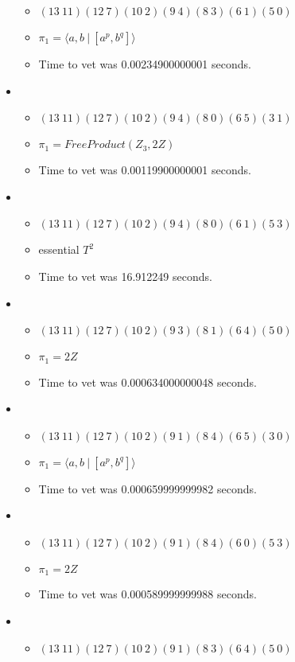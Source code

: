 \documentclass{article}
\begin{document}
\begin{itemize}
\begin{itemize}
      \item $(13\ 11)(12\ 7)(10\ 2)(9\ 4)(8\ 3)(6\ 1)(5\ 0)$
      \item $\pi_1 = \langle a,b\ |\ [a^p,b^q]\rangle$
      \item Time to vet was 0.00234900000001 seconds.
\end{itemize}
\item \begin{itemize}
      \item $(13\ 11)(12\ 7)(10\ 2)(9\ 4)(8\ 0)(6\ 5)(3\ 1)$
      \item $\pi_1 =FreeProduct( Z_3, 2 Z )$
      \item Time to vet was 0.00119900000001 seconds.
\end{itemize}
\item \begin{itemize}
      \item $(13\ 11)(12\ 7)(10\ 2)(9\ 4)(8\ 0)(6\ 1)(5\ 3)$
      \item essential $T^2$
      \item Time to vet was 16.912249 seconds.
\end{itemize}
\item \begin{itemize}
      \item $(13\ 11)(12\ 7)(10\ 2)(9\ 3)(8\ 1)(6\ 4)(5\ 0)$
      \item $\pi_1 =2 Z$
      \item Time to vet was 0.000634000000048 seconds.
\end{itemize}
\item \begin{itemize}
      \item $(13\ 11)(12\ 7)(10\ 2)(9\ 1)(8\ 4)(6\ 5)(3\ 0)$
      \item $\pi_1 = \langle a,b\ |\ [a^p,b^q]\rangle$
      \item Time to vet was 0.000659999999982 seconds.
\end{itemize}
\item \begin{itemize}
      \item $(13\ 11)(12\ 7)(10\ 2)(9\ 1)(8\ 4)(6\ 0)(5\ 3)$
      \item $\pi_1 =2 Z$
      \item Time to vet was 0.000589999999988 seconds.
\end{itemize}
\item \begin{itemize}
      \item $(13\ 11)(12\ 7)(10\ 2)(9\ 1)(8\ 3)(6\ 4)(5\ 0)$

\end{itemize}
\end{itemize}
\end{document}
